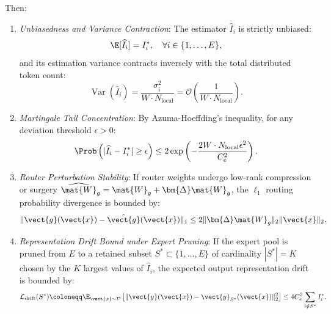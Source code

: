 \begin{theorem}
Then:
\begin{enumerate}
    \item \emph{Unbiasedness and Variance Contraction}: The estimator $\widehat{I}_i$ is strictly unbiased:
    \begin{equation}
    \E[\widehat{I}_i] = I_i^*, \quad \forall i \in \{1, \dots, E\},
    \label{eq:reap_unbiased_claim}
    \end{equation}
    and its estimation variance contracts inversely with the total distributed token count:
    \begin{equation}
    \operatorname{Var}(\widehat{I}_i) = \frac{\sigma_i^2}{W \cdot N_{\text{local}}} = \mathcal{O}\left( \frac{1}{W \cdot N_{\text{local}}} \right).
    \label{eq:reap_variance_claim}
    \end{equation}
    \item \emph{Martingale Tail Concentration}: By Azuma-Hoeffding's inequality, for any deviation threshold $\epsilon > 0$:
    \begin{equation}
    \Prob\left( |\widehat{I}_i - I_i^*| \ge \epsilon \right) \le 2 \exp\left( -\frac{2 W \cdot N_{\text{local}} \epsilon^2}{C_e^2} \right).
    \label{eq:reap_azuma_bound}
    \end{equation}
    \item \emph{Router Perturbation Stability}: If router weights undergo low-rank compression or surgery $\widehat{\mat{W}}_g = \mat{W}_g + \bm{\Delta}\mat{W}_g$, the $\ell_1$ routing probability divergence is bounded by:
    \begin{equation}
    \|\vect{g}(\vect{x}) - \hat{\vect{g}}(\vect{x})\|_1 \le 2 \|\bm{\Delta}\mat{W}_g\|_2 \|\vect{x}\|_2.
    \label{eq:reap_router_perturbation}
    \end{equation}
    \item \emph{Representation Drift Bound under Expert Pruning}:
    If the expert pool is pruned from $E$ to a retained subset $S^* \subset \{1, \dots, E\}$ of cardinality $|S^*| = K$ chosen by the $K$ largest values of $\widehat{I}_i$, the expected output representation drift is bounded by:
    \begin{equation}
    \mathcal{L}_{\text{drift}}(S^*) \coloneqq \E_{\vect{x} \sim \mathcal{D}}\left[ \|\vect{y}(\vect{x}) - \vect{y}_{S^*}(\vect{x})\|_2^2 \right] \le 4 C_e^2 \sum_{i \notin S^*} I_i^*.
    \label{eq:reap_representation_drift_bound}
    \end{equation}
\end{enumerate}
\end{theorem}

